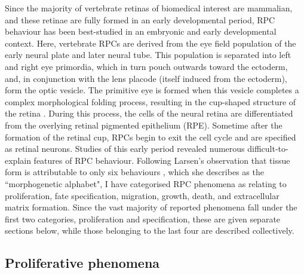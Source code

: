 Since the majority of vertebrate retinas of biomedical interest are mammalian, and these retinae are fully formed in an early developmental period, RPC behaviour has been best-studied in an embryonic and early developmental context. Here, vertebrate RPCs are derived from the eye field population of the early neural plate and later neural tube. This population is separated into left and right eye primordia, which in turn pouch outwards toward the ectoderm, and, in conjunction with the lens placode (itself induced from the ectoderm), form the optic vesicle. The primitive eye is formed when this vesicle completes a complex morphological folding process, resulting in the cup-shaped structure of the retina \cite{Cavodeassi2018}. During this process, the cells of the neural retina are differentiated from the overlying retinal pigmented epithelium (RPE). Sometime after the formation of the retinal cup, RPCs begin to exit the cell cycle and are specified as retinal neurons. Studies of this early period revealed numerous difficult-to-explain features of RPC behaviour. Following Larsen's observation that tissue form is attributable to only six behaviours \cite{Larsen1992}, which she describes as the ``morphogenetic alphabet", I have categorised RPC phenomena as relating to proliferation, fate specification, migration, growth, death, and extracellular matrix formation. Since the vast majority of reported phenomena fall under the first two categories, proliferation and specification, these are given separate sections below, while those belonging to the last four are described collectively.

\subsection{Proliferative phenomena}

